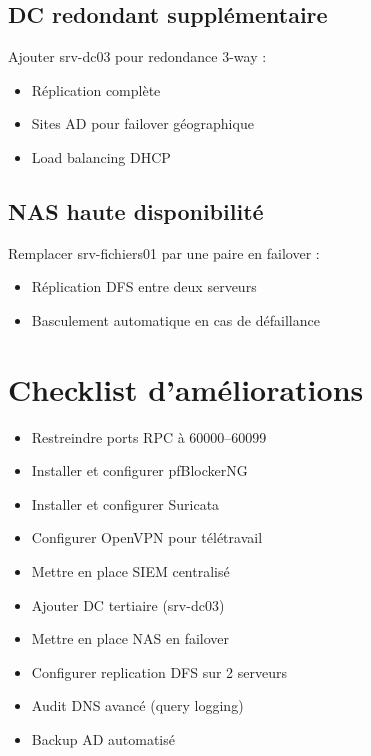 \subsection{DC redondant supplémentaire}

Ajouter srv-dc03 pour redondance 3-way :

\begin{itemize}
    \item Réplication complète
    \item Sites AD pour failover géographique
    \item Load balancing DHCP
\end{itemize}

\subsection{NAS haute disponibilité}

Remplacer srv-fichiers01 par une paire en failover :

\begin{itemize}
    \item Réplication DFS entre deux serveurs
    \item Basculement automatique en cas de défaillance
\end{itemize}

\section{Checklist d'améliorations}

\begin{itemize}
    \item[ ] Restreindre ports RPC à 60000–60099
    \item[ ] Installer et configurer pfBlockerNG
    \item[ ] Installer et configurer Suricata
    \item[ ] Configurer OpenVPN pour télétravail
    \item[ ] Mettre en place SIEM centralisé
    \item[ ] Ajouter DC tertiaire (srv-dc03)
    \item[ ] Mettre en place NAS en failover
    \item[ ] Configurer replication DFS sur 2 serveurs
    \item[ ] Audit DNS avancé (query logging)
    \item[ ] Backup AD automatisé
\end{itemize}
